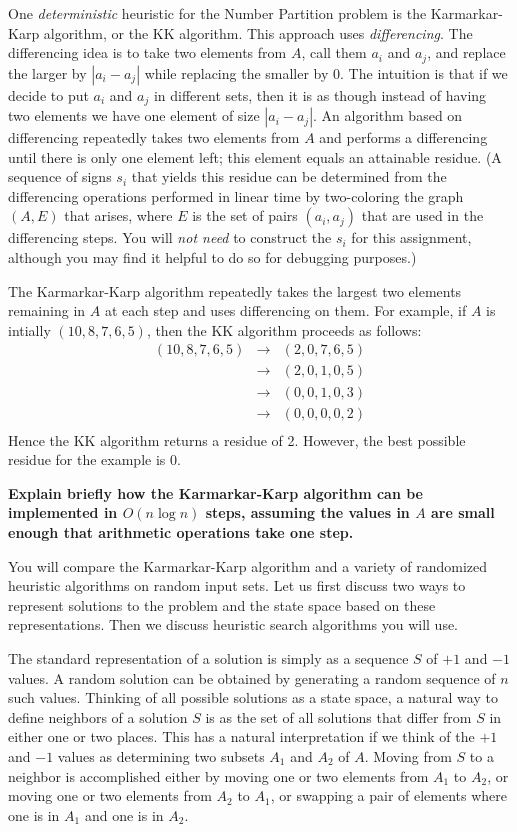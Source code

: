 \documentclass[11pt]{article}
\begin{document}
One {\em deterministic} heuristic for the Number Partition problem is the
Karmarkar-Karp algorithm, or the KK algorithm.  This approach uses
{\em differencing}.  The differencing idea is to take two elements
from $A$, call them $a_i$ and $a_j$, and replace the larger by $|a_i -
a_j|$ while replacing the smaller by 0.  The intuition is that if we
decide to put $a_i$ and $a_j$ in different sets, then it is as though
instead of having two elements we have one element of size $|a_i - a_j|$.  
An algorithm based
on differencing repeatedly takes two elements from $A$ and performs a
differencing until there is only one element left; this element equals
an attainable residue.  (A sequence of signs $s_i$ that yields this
residue can be determined from the differencing operations performed
in linear time by two-coloring the graph $(A,E)$ that arises, where
$E$ is the set of pairs $(a_i,a_j)$ that are used in the differencing
steps.  You will {\em not need} to construct the $s_i$ for this assignment,
although you may find it helpful to do so for debugging purposes.)

The Karmarkar-Karp algorithm repeatedly takes the
largest two elements remaining in $A$ at each step and uses
differencing on
them.  For example, if $A$ is intially $(10,8,7,6,5)$, then the KK
algorithm proceeds as follows:
\begin{eqnarray*}
(10,8,7,6,5) & \rightarrow & (2,0,7,6,5) \\
 & \rightarrow & (2,0,1,0,5) \\
 & \rightarrow & (0,0,1,0,3) \\
 & \rightarrow & (0,0,0,0,2) \\
\end{eqnarray*}
Hence the KK algorithm returns a residue of 2.  However, the best possible
residue for the example is 0.

\smallskip 
{\bf Explain briefly how the Karmarkar-Karp algorithm can be 
implemented in $O(n \log n)$ steps, assuming the values in 
$A$ are small enough that arithmetic operations take one step.}
\smallskip 

You will compare the Karmarkar-Karp algorithm and a variety of
randomized heuristic algorithms on random input sets.  Let us first
discuss two ways to represent solutions to the problem and the state
space based on these representations.  Then we discuss heuristic
search algorithms you will use.

The standard representation of a solution is simply as a sequence $S$
of $+1$ and $-1$ values.  A random solution can be obtained by
generating a random sequence of $n$ such values.  Thinking of all
possible solutions as a state space, a natural way to define neighbors
of a solution $S$ is as the set of all solutions that differ from $S$
in either one or two places.  This has a natural interpretation if we
think of the $+1$ and $-1$ values as determining two subsets $A_1$
and $A_2$ of $A$.  Moving from $S$ to a neighbor is accomplished
either by moving one or two elements from $A_1$ to $A_2$, or moving
one or two elements from $A_2$ to $A_1$, or swapping a pair of
elements where one is in $A_1$ and one is in $A_2$.
\end{document}
